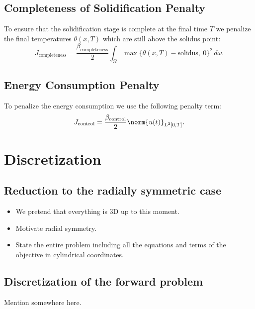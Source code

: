 \subsection{Completeness of Solidification Penalty}

To ensure that the solidification stage is complete at the final time $T$ we penalize the final temperatures $\theta(x, T)$ which are still above the solidus point:
\begin{equation}
	J_{\text{completeness}} =
	\frac{\beta_\text{completeness}}{2} \int_{\Omega} \max\{ \theta(x, T) - \text{solidus},\ 0 \}^2\, d\omega.
\end{equation}

\subsection{Energy Consumption Penalty}

To penalize the energy consumption we use the following penalty term:
\begin{equation}
	J_{\text{control}} =
	\frac{\beta_\text{control}}{2} \norm{u(t)}_{L^2[0,T]}.
\end{equation}



\section{Discretization}
\label{sec:discretization}

\subsection{Reduction to the radially symmetric case}

{\color{TolHighContrastBlue}
\begin{itemize}
	\item We pretend that everything is 3D up to this moment.
	\item Motivate radial symmetry.
	\item State the entire problem including all the equations and terms of the objective in cylindrical coordinates.
\end{itemize}
}

\subsection{Discretization of the forward problem}

{\color{TolHighContrastBlue}
Mention \fenics somewhere here.
}


